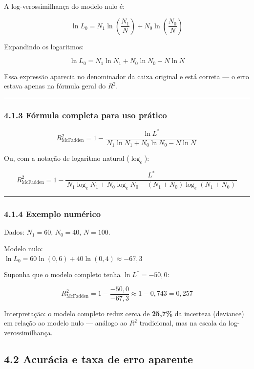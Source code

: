 \documentclass[
  letterpaper,
  DIV=11,
  numbers=noendperiod]{scrartcl}
\begin{document}
A log-verossimilhança do modelo nulo é:

\[
\ln L_0 = N_1 \ln\!\left(\frac{N_1}{N}\right) + N_0 \ln\!\left(\frac{N_0}{N}\right)
\]

Expandindo os logaritmos:

\[
\ln L_0 = N_1 \ln N_1 + N_0 \ln N_0 - N \ln N
\]

Essa expressão aparecia no denominador da caixa original e está correta
--- o erro estava apenas na fórmula geral do \(R^2\).

\begin{center}\rule{0.5\linewidth}{0.5pt}\end{center}

\subsubsection{4.1.3 Fórmula completa para uso
prático}\label{fuxf3rmula-completa-para-uso-pruxe1tico}

\[
\boxed{
R^2_{\text{McFadden}} = 1 - \frac{\ln L^*}{\,N_1 \ln N_1 + N_0 \ln N_0 - N \ln N\,}
}
\]

Ou, com a notação de logaritmo natural (\(\log_e\)):

\[
\boxed{
R^2_{\text{McFadden}} = 1 - \frac{L^*}{\,N_1\log_e N_1 + N_0\log_e N_0 - (N_1+N_0)\log_e(N_1+N_0)\,}
}
\]

\begin{center}\rule{0.5\linewidth}{0.5pt}\end{center}

\subsubsection{4.1.4 Exemplo numérico}\label{exemplo-numuxe9rico}

Dados: \(N_1 = 60\), \(N_0 = 40\), \(N = 100\).

Modelo nulo:\\
\(\ln L_0 = 60\ln(0{,}6) + 40\ln(0{,}4) \approx -67{,}3\)

Suponha que o modelo completo tenha \(\ln L^* = -50{,}0\):

\[
R^2_{\text{McFadden}} = 1 - \frac{-50{,}0}{-67{,}3} \approx 1 - 0{,}743 = 0{,}257
\]

Interpretação: o modelo completo reduz cerca de \textbf{25,7\%} da
incerteza (deviance) em relação ao modelo nulo --- análogo ao \(R^2\)
tradicional, mas na escala da log-verossimilhança.

\subsection{4.2 Acurácia e taxa de erro
aparente}\label{acuruxe1cia-e-taxa-de-erro-aparente}
\end{document}
